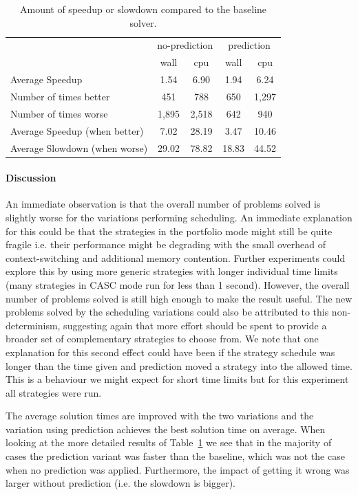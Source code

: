 \documentclass{llncs}
\begin{document}
\begin{table}[t]
\caption{Amount of speedup or slowdown compared to the baseline solver.\label{tab:speedup}}
\centering
\begin{tabular}{l|cc|cc}
		& \multicolumn{2}{c|}{no-prediction} & \multicolumn{2}{c}{prediction} \\ \cline{2-5}
		& wall & cpu & wall & cpu \\ \hline
Average Speedup &1.54 & 6.90 & 1.94 & 6.24 \\ \hline
Number of times better & 451 & 788 & 650 & 1,297 \\
Number of times worse & 1,895 & 2,518 & 642 & 940\\ \hline
Average Speedup (when better) & 7.02 & 28.19 &  3.47& 10.46 \\
Average Slowdown (when worse) & 29.02 & 78.82 & 18.83 & 44.52\\
\end{tabular}
\end{table}

\paragraph{Discussion} An immediate observation is that the overall number of problems solved is slightly worse for the variations performing scheduling. An immediate explanation for this could be that the strategies in the portfolio mode might still be quite fragile i.e. their performance might be degrading with the small overhead of context-switching and additional memory contention. Further experiments could explore this by using more generic strategies with longer individual time limits (many strategies in CASC mode run for less than 1 second). However, the overall number of problems solved is still high enough to make the result useful. The new problems solved by the scheduling variations could also be attributed to this non-determinism, suggesting again that more effort should be spent to provide a broader set of complementary strategies to choose from. We note that one explanation for this second effect could have been if the strategy schedule was longer than the time given and prediction moved a strategy into the allowed time. This is a behaviour we might expect for short time limits but for this experiment all strategies were run.

The average solution times are improved with the two variations and the variation using prediction achieves the best solution time on average. When looking at the more detailed results of Table~\ref{tab:speedup} we see that in the majority of cases the prediction variant was faster than the baseline, which was not the case when no prediction was applied. Furthermore, the impact of getting it wrong was larger without prediction (i.e. the slowdown is bigger).
\end{document}
